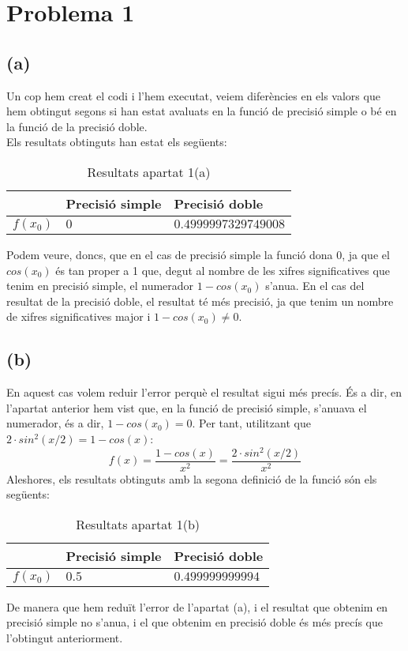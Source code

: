 \documentclass[a4paper,10pt]{article}
\begin{document}
\section*{Problema 1}
\subsection*{(a)}
  Un cop hem creat el codi i l'hem executat, veiem diferències en els valors que hem obtingut segons si han estat avaluats en la funció de precisió simple o bé en la funció de la precisió doble.\\
  Els resultats obtinguts han estat els següents:
  \begin{table}[H]
    \begin{center}
      \begin{tabular}[c]{|p{10mm}|p{35mm}|p{35mm}|}
      \hline 
      & Precisió simple & Precisió doble \\ 
      \hline 
      $f(x_0)$  
      & 
      $0$
      & 
      $0.4999997329749008$ \\
      \hline
      \end{tabular}
    \caption{Resultats apartat 1(a)}
    \end{center}
  \end{table}
  Podem veure, doncs, que en el cas de precisió simple la funció dona 0, ja que el $cos(x_0)$ és tan proper a 1 que, degut al nombre de les xifres significatives que tenim en precisió simple, el numerador $1-cos(x_0)$ s'anu\lgem a. En el cas del resultat de la precisió doble, el resultat té més precisió, ja que tenim un nombre de xifres significatives major i $1 - cos(x_0) \neq 0$.
  \subsection*{(b)}
  En aquest cas volem reduir l'error perquè el resultat sigui més precís. És a dir, en l'apartat anterior hem vist que, en la funció de precisió simple, s'anu\lgem ava el numerador, és a dir, $1-cos(x_0) = 0$. Per tant, utilitzant que $2 \cdot sin^2(x/2) = 1 - cos(x)$:
  \begin{equation*}
    f(x) = \frac{1-cos(x)}{x^2} = \frac{2\cdot sin^2(x/2) }{x^2}
  \end{equation*}
  Aleshores, els resultats obtinguts amb la segona definició de la funció són els següents:
  \begin{table}[H]
    \begin{center}
      \begin{tabular}[c]{|p{10mm}|p{35mm}|p{35 mm}|}
      \hline 
      & Precisió simple & Precisió doble \\ 
      \hline 
      $f(x_0)$  
      & 
      $0.5$
      & 
      $0.499999999994$ \\
      \hline
      \end{tabular}
    \caption{Resultats apartat 1(b)}
    \end{center}
  \end{table}
  De manera que hem reduït l'error de l'apartat (a), i el resultat que obtenim en precisió simple no s'anu\lgem a, i el que obtenim en precisió doble és més precís que l'obtingut anteriorment.
\end{document}
